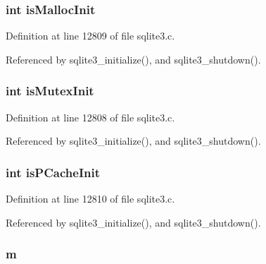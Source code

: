 \subsubsection[{is\+Malloc\+Init}]{\setlength{\rightskip}{0pt plus 5cm}int is\+Malloc\+Init}\label{struct_sqlite3_config_ab3402c7fd0c57cc1383280eb49ebb159}


Definition at line 12809 of file sqlite3.\+c.



Referenced by sqlite3\+\_\+initialize(), and sqlite3\+\_\+shutdown().

\hypertarget{struct_sqlite3_config_a5e1feee8fb346216d60009b8f8706ae9}{}
\subsubsection[{is\+Mutex\+Init}]{\setlength{\rightskip}{0pt plus 5cm}int is\+Mutex\+Init}\label{struct_sqlite3_config_a5e1feee8fb346216d60009b8f8706ae9}


Definition at line 12808 of file sqlite3.\+c.



Referenced by sqlite3\+\_\+initialize(), and sqlite3\+\_\+shutdown().

\hypertarget{struct_sqlite3_config_ae992d949693471b5a7afeac185afd014}{}
\subsubsection[{is\+P\+Cache\+Init}]{\setlength{\rightskip}{0pt plus 5cm}int is\+P\+Cache\+Init}\label{struct_sqlite3_config_ae992d949693471b5a7afeac185afd014}


Definition at line 12810 of file sqlite3.\+c.



Referenced by sqlite3\+\_\+initialize(), and sqlite3\+\_\+shutdown().

\hypertarget{struct_sqlite3_config_a1330f8bd731e42003426946f2e7df47f}{}
\subsubsection[{m}]{ m}\label{struct_sqlite3_config_a1330f8bd731e42003426946f2e7df47f}


